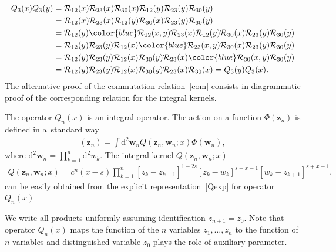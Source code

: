 \documentclass[pdftex]{sigma}
\newcommand{\blue}{\color{blue}}
\numberwithin{equation}{section}
\begin{document}
\begin{align*}
Q_3( x) Q_3( y) & =
\mathcal{R}_{12}(x) \mathcal{R}_{23}(x) \mathcal{R}_{30}(x)
\mathcal{R}_{12}(y) \mathcal{R}_{23}(y) \mathcal{R}_{30}(y) \\
& =
\mathcal{R}_{12}(x) \mathcal{R}_{23}(x)
\mathcal{R}_{12}(y) \mathcal{R}_{30}(x)
\mathcal{R}_{23}(y) \mathcal{R}_{30}(y) \\
& =
\mathcal{R}_{12}(y) {\blue \mathcal{R}_{12}(x,y)} \mathcal{R}_{23}(x)
\mathcal{R}_{12}(y) \mathcal{R}_{30}(x)
\mathcal{R}_{23}(y) \mathcal{R}_{30}(y) \\
& =
\mathcal{R}_{12}(y) \mathcal{R}_{23}(y)
\mathcal{R}_{12}(x) {\blue \mathcal{R}_{23}(x,y)} \mathcal{R}_{30}(x)
\mathcal{R}_{23}(y) \mathcal{R}_{30}(y) \\
& =
\mathcal{R}_{12}(y) \mathcal{R}_{23}(y)
\mathcal{R}_{12}(x) \mathcal{R}_{30}(y)
\mathcal{R}_{23}(x) {\blue \mathcal{R}_{30}(x,y)} \mathcal{R}_{30}(y) \\
& =
\mathcal{R}_{12}(y) \mathcal{R}_{23}(y)
\mathcal{R}_{12}(x) \mathcal{R}_{30}(y)
\mathcal{R}_{23}(x) \mathcal{R}_{30}(x) = Q_3( y) Q_3( x) .
\end{align*}
The alternative proof of the commutation relation~\eqref{com}
consists in diagrammatic proof of the corresponding relation
for the integral kernels.

The operator $Q_n(x)$ is an integral operator.
The action on a function $\Phi(\bm z_n)$ is defined in a~standard way
\begin{align*}
[Q_n( x) \Phi](\bm z_n) = \int \mathrm{d}^{2} \bm w_n
 Q(\bm z_n,\bm w_n;x) \Phi(\bm w_n) ,
\end{align*}
where $\mathrm{d}^{2}\bm w_n = \prod_{k=1}^{n} \mathrm{d}^2 w_k$.
The integral kernel $Q(\bm z_n,\bm w_n;x)$
\begin{align*}
Q(\bm z_n,\bm w_n;x) = c^n(x-s)
\prod_{k=1}^{n}
[z_k-z_{k+1}]^{1-2s}
[z_k-w_k]^{s-x-1}[w_k-z_{k+1}]^{s+x-1} .
\end{align*}
can be easily obtained
from the explicit representation~\eqref{Qexp} for operator $Q_n(x)$


We write all products uniformly assuming identification $z_{n+1}=z_0$.
Note that operator $Q_n( x)$ maps the function of the $n$ variables
$z_1 ,\dots ,z_n$ to the function of $n$ variables and
distinguished variable $z_0$ plays the role of auxiliary parameter.
\end{document}
